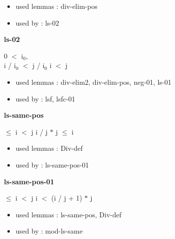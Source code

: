 \documentclass[a4paper]{article}
\begin{document}
\begin{itemize}


\item       used lemmas  : div-elim-pos
\item       used by      : ls-02

\end{itemize}

\medskip

\bigskip

{\large\bf ls-02}

\medskip

0 $<$ $\mbox{i}_{0}$, \\
i / $\mbox{i}_{0}$ $<$ j / $\mbox{i}_{0}$ \Fol i $<$ j

\begin{itemize}


\item       used lemmas  : div-elim2, div-elim-pos, neg-01, ls-01
\item       used by      : lsf, lsfc-01

\end{itemize}

\medskip

\bigskip

{\large\bf ls-same-pos}

\medskip

  $\le$ i  $<$ j \Imp i / j $*$ j $\le$ i

\begin{itemize}


\item       used lemmas  : Div-def
\item       used by      : ls-same-pos-01

\end{itemize}

\medskip

\bigskip

{\large\bf ls-same-pos-01}

\medskip

  $\le$ i  $<$ j \Imp i $<$ (i / j + 1) $*$ j

\begin{itemize}


\item       used lemmas  : ls-same-pos, Div-def
\item       used by      : mod-ls-same

\end{itemize}

\medskip
\end{document}
